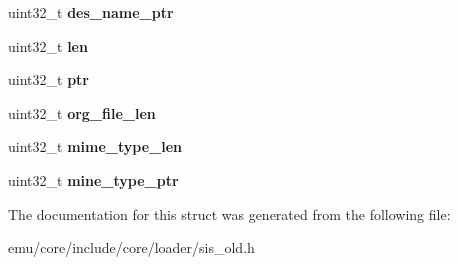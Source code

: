 \begin{DoxyCompactItemize}
uint32\+\_\+t {\bfseries des\+\_\+name\+\_\+ptr}
\item 
\mbox{\label{structeka2l1_1_1loader_1_1sis__old__file__record_a3cbc3443ff5e2e5367d27992109f48cf}} 
uint32\+\_\+t {\bfseries len}
\item 
\mbox{\label{structeka2l1_1_1loader_1_1sis__old__file__record_aa21d6920ea609418312cc96957248590}} 
uint32\+\_\+t {\bfseries ptr}
\item 
\mbox{\label{structeka2l1_1_1loader_1_1sis__old__file__record_a97bb05be3685fa4cb23612c82d1deb41}} 
uint32\+\_\+t {\bfseries org\+\_\+file\+\_\+len}
\item 
\mbox{\label{structeka2l1_1_1loader_1_1sis__old__file__record_ac9ed15772a3069c09153b3422faf529d}} 
uint32\+\_\+t {\bfseries mime\+\_\+type\+\_\+len}
\item 
\mbox{\label{structeka2l1_1_1loader_1_1sis__old__file__record_a55ef26de0ca6845ea45e2ecffc67280e}} 
uint32\+\_\+t {\bfseries mine\+\_\+type\+\_\+ptr}
\end{DoxyCompactItemize}


The documentation for this struct was generated from the following file\+:\begin{DoxyCompactItemize}
\item 
emu/core/include/core/loader/sis\+\_\+old.\+h\end{DoxyCompactItemize}
